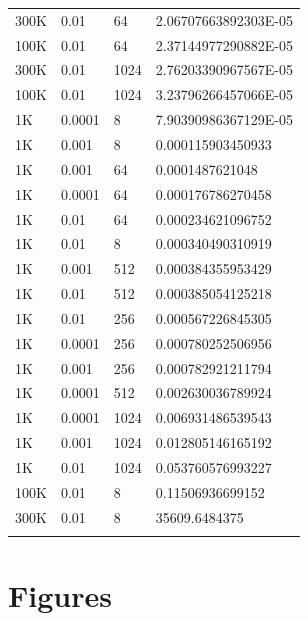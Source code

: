 \begin{table}[H]
\begin{tabular}{llll}
300K     & 0.01  & 64   & 2.06707663892303E-05 \\ 
100K     & 0.01  & 64   & 2.37144977290882E-05 \\ 
300K     & 0.01  & 1024  & 2.76203390967567E-05 \\ 
100K     & 0.01  & 1024  & 3.23796266457066E-05 \\ 
1K      & 0.0001 & 8    & 7.90390986367129E-05 \\ 
1K      & 0.001 & 8    & 0.000115903450933   \\ 
1K      & 0.001 & 64   & 0.0001487621048     \\ 
1K      & 0.0001 & 64   & 0.000176786270458   \\ 
1K      & 0.01  & 64   & 0.000234621096752   \\ 
1K      & 0.01  & 8    & 0.000340490310919   \\ 
1K      & 0.001 & 512  & 0.000384355953429   \\ 
1K      & 0.01  & 512  & 0.000385054125218   \\ 
1K      & 0.01  & 256  & 0.000567226845305   \\ 
1K      & 0.0001 & 256  & 0.000780252506956   \\ 
1K      & 0.001 & 256  & 0.000782921211794   \\ 
1K      & 0.0001 & 512  & 0.002630036789924   \\ 
1K      & 0.0001 & 1024  & 0.006931486539543   \\ 
1K      & 0.001 & 1024  & 0.012805146165192   \\ 
1K      & 0.01  & 1024  & 0.053760576993227   \\ 
100K     & 0.01  & 8    & 0.11506936699152    \\ 
300K                           & 0.01                        & 8                          & 35609.6484375                             \\
\bottomrule\\
\end{tabular}
\end{table}




\section{Figures}

